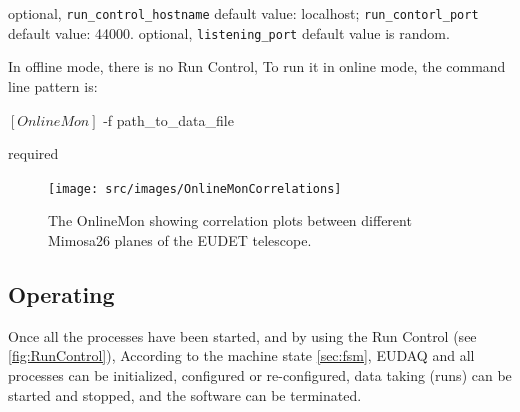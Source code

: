 \begin{description}
optional, \texttt{run\_control\_hostname} default value: localhost;  \texttt{run\_contorl\_port}  default value: 44000.
optional, \texttt{listening\_port} default value is random.
\end{description}

In offline mode, there is no Run Control, To run it in online mode, the command line pattern is:
\begin{listing}[mybash]
$[OnlineMon]$ -f {path_to_data_file}
\end{listing}

\begin{description}
required
\end{description}

\begin{figure}[htb]
  \begin{center}
    \texttt{[image: src/images/OnlineMonCorrelations]}
    \caption{The OnlineMon showing correlation plots between different
      Mimosa26 planes of the EUDET telescope.}
    \label{fig:OnlineMonPlots}
  \end{center}
\end{figure}

\subsection{Operating}
Once all the processes have been started, 
and by using the Run Control (see \autoref{fig:RunControl}),
According to the machine state \autoref{sec:fsm}, EUDAQ and all processes can be initialized, configured or re-configured, data taking (runs) can be started and stopped, and the software can be terminated.

